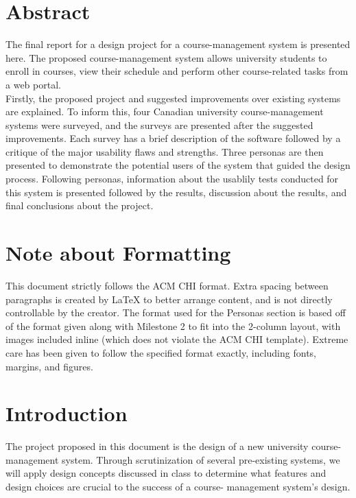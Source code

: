 \documentclass[10pt]{article}
\begin{document}
\begin{multicols}{2}

\section*{Abstract}
The final report for a design project for a course-management system is presented 
here. The proposed course-management system allows university students to enroll in courses, view their 
schedule and perform other course-related tasks from a web portal.\\

Firstly, the proposed project and suggested improvements over existing systems are explained. To inform this, four Canadian university course-management systems were surveyed, and the surveys are presented after the suggested improvements. Each survey 
has a brief description of the software followed by a critique of the major usability flaws and 
strengths. Three personas are then presented to demonstrate the potential users of the system that guided the design process. Following personas, information about the usablily 
tests conducted for this system is presented followed by the results, discussion about the results, and final conclusions about the project.

\section*{Note about Formatting}
This document strictly follows the ACM CHI format. Extra spacing between paragraphs is created by LaTeX to better arrange content, and is not directly controllable by the creator. The format used for the Personas section is based off of the format given along with Milestone 2 to fit into the 2-column layout, with images included inline (which does not violate the ACM CHI template). Extreme care has been given to follow the specified format exactly, including fonts, margins, and figures.

\section*{Introduction}

The project proposed in this document is the design of a new 
university course-management system. Through scrutinization of several 
pre-existing systems, we will apply design concepts discussed in class to 
determine what features and design choices are crucial to the success of a course-
management system's design.\\


\end{multicols}
\end{document}
